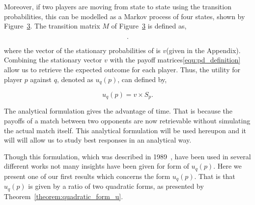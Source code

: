 \documentclass[10pt]{article}
\begin{document}
\begin{figure}
    \centering
    \begin{subfigure}{0.45\textwidth}
        \centering
        
        \label{fig:diagram_mem_one}
    \end{subfigure}
    \begin{subfigure}{0.45\textwidth}
        \centering
        
        \label{fig:markov_chain}
    \end{subfigure}
\end{figure}

Moreover, if two players are moving from state to state using the transition
probabilities, this can be modelled as a Markov process of four states, shown by
Figure~\ref{fig:markov_chain}. The transition matrix \(M\) of Figure~\ref{fig:markov_chain}
is defined as,

\begin{equation}\label{eq:m_matrix}
    .
\end{equation}

where the vector of the stationary probabilities of is \(v\)(given in the Appendix). %
Combining the stationary vector \(v\) with the payoff matrices\ref{equ:pd_definition}
allow us to retrieve the expected outcome for each player. Thus, the utility for
player \(p\) against \(q\), denoted as \(u_q(p)\), can defined by,

\begin{equation}\label{eq:press_dyson_utility}
    u_q(p) = v \times S_p.
\end{equation}

The analytical formulation gives the advantage of time. That is because the 
payoffs of a match between two opponents are now retrievable without 
simulating the actual match itself. This analytical formulation will be used
hereupon and it will will allow us to study best responses in an analytical way.

Though this formulation, which was described in 1989~\cite{Nowak1989}, have been
used in several different works not many insights have been given for form of \(u_q(p)\).
Here we present one of our first results which concerns the form \(u_q(p)\). That is
that \(u_q(p)\) is given by a ratio of two quadratic forms, as presented
by Theorem~\ref{theorem:quadratic_form_u}.
\end{document}

